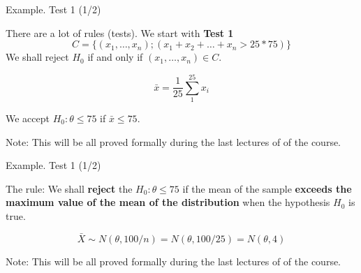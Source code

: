 \documentclass{beamer}
\begin{document}
\begin{frame}
{\centerline{Example. Test 1 (1/2)}}
There are a lot of rules (tests). We start with \textbf{Test 1}
$$C = \{ (x_1,\ldots, x_n); (x_1 + x_2 + \ldots + x_n > 25*75) \}$$
We shall reject $H_0$ if and only if $(x_1,\ldots, x_n) \in C$.

$$\bar{x} = \frac{1}{25} \sum_{1}^{25} x_i$$

We accept $H_0: \theta \leq 75$ if $\bar{x} \leq 75$. 

\vspace*{1cm}
\begin{center}
Note: This will be all proved formally during the last lectures of of the course.
\end{center}

\end{frame}





\begin{frame}
{\centerline{Example. Test 1 (1/2)}}

The rule: We shall \textbf{reject} the $H_0: \theta \leq 75$ if the mean of the sample \textbf{exceeds the maximum value of the mean of the distribution} when the hypothesis $H_0$ is true.
\newline 

$$\bar{X} \sim N(\theta, 100/n) = N(\theta, 100/25) = N(\theta, 4)$$

\vspace*{1cm}
\begin{center}
Note: This will be all proved formally during the last lectures of of the course.
\end{center}

\end{frame}





\end{document}
